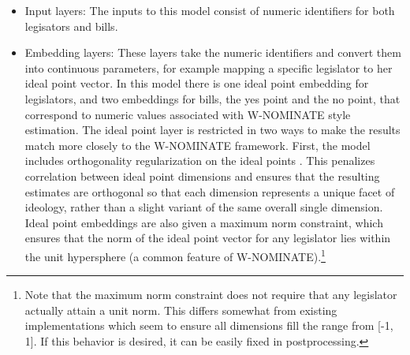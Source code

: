 \documentclass[11pt,]{article}
\begin{document}
\begin{itemize}
\item
  Input layers: The inputs to this model consist of numeric identifiers
  for both legisators and bills.
\item
  Embedding layers: These layers take the numeric identifiers and
  convert them into continuous parameters, for example mapping a
  specific legislator to her ideal point vector. In this model there is
  one ideal point embedding for legislators, and two embeddings for
  bills, the yes point and the no point, that correspond to numeric
  values associated with W-NOMINATE style estimation. The ideal point
  layer is restricted in two ways to make the results match more closely
  to the W-NOMINATE framework. First, the model includes orthogonality
  regularization on the ideal points \citep{orthreg1, orthreg2}. This
  penalizes correlation between ideal point dimensions and ensures that
  the resulting estimates are orthogonal so that each dimension
  represents a unique facet of ideology, rather than a slight variant of
  the same overall single dimension. Ideal point embeddings are also
  given a maximum norm constraint, which ensures that the norm of the
  ideal point vector for any legislator lies within the unit hypersphere
  (a common feature of W-NOMINATE).\footnote{Note that the maximum norm
    constraint does not require that any legislator actually attain a
    unit norm. This differs somewhat from existing implementations which
    seem to ensure all dimensions fill the range from {[}-1, 1{]}. If
    this behavior is desired, it can be easily fixed in postprocessing.}
\end{itemize}
\end{document}
